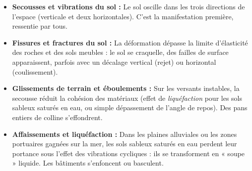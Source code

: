 \documentclass[11pt]{article}
\begin{document}
\begin{itemize}
    \item \textbf{Secousses et vibrations du sol :} Le sol oscille dans les trois directions de l'espace (verticale et deux horizontales). C'est la manifestation première, ressentie par tous.
    \item \textbf{Fissures et fractures du sol :} La déformation dépasse la limite d'élasticité des roches et des sols meubles : le sol se craquelle, des failles de surface apparaissent, parfois avec un décalage vertical (rejet) ou horizontal (coulissement).
    \item \textbf{Glissements de terrain et éboulements :} Sur les versants instables, la secousse réduit la cohésion des matériaux (effet de \emph{liquéfaction} pour les sols sableux saturés en eau, ou simple dépassement de l'angle de repos). Des pans entiers de colline s'effondrent.
    \item \textbf{Affaissements et liquéfaction :} Dans les plaines alluviales ou les zones portuaires gagnées sur la mer, les sols sableux saturés en eau perdent leur portance sous l'effet des vibrations cycliques : ils se transforment en « soupe » liquide. Les bâtiments s'enfoncent ou basculent.
\end{itemize}
\end{document}
